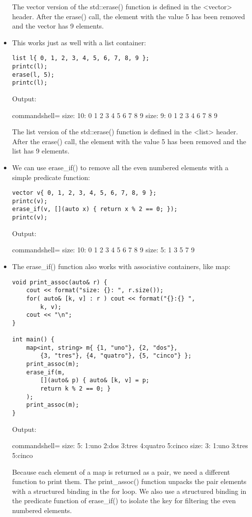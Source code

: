 \begin{itemize}
The vector version of the std::erase() function is defined in the <vector> header. After the erase() call, the element with the value 5 has been removed and the vector has 9 elements.

\item 
This works just as well with a list container:

\begin{lstlisting}[style=styleCXX]
list l{ 0, 1, 2, 3, 4, 5, 6, 7, 8, 9 };
printc(l);
erase(l, 5);
printc(l);
\end{lstlisting}

Output:

\begin{tcblisting}{commandshell={}}
size: 10: 0 1 2 3 4 5 6 7 8 9
size: 9: 0 1 2 3 4 6 7 8 9
\end{tcblisting}

The list version of the std::erase() function is defined in the <list> header. After the erase() call, the element with the value 5 has been removed and the list has 9 elements.

\item 
We can use erase\_if() to remove all the even numbered elements with a simple predicate function:

\begin{lstlisting}[style=styleCXX]
vector v{ 0, 1, 2, 3, 4, 5, 6, 7, 8, 9 };
printc(v);
erase_if(v, [](auto x) { return x % 2 == 0; });
printc(v);
\end{lstlisting}

Output:

\begin{tcblisting}{commandshell={}}
size: 10: 0 1 2 3 4 5 6 7 8 9
size: 5: 1 3 5 7 9
\end{tcblisting}

\item 
The erase\_if() function also works with associative containers, like map:

\begin{lstlisting}[style=styleCXX]
void print_assoc(auto& r) {
	cout << format("size: {}: ", r.size());
	for( auto& [k, v] : r ) cout << format("{}:{} ",
		k, v);
	cout << "\n";
}

int main() {
	map<int, string> m{ {1, "uno"}, {2, "dos"},
		{3, "tres"}, {4, "quatro"}, {5, "cinco"} };
	print_assoc(m);
	erase_if(m,
		[](auto& p) { auto& [k, v] = p;
		return k % 2 == 0; }
	);
	print_assoc(m);
}
\end{lstlisting}

Output:

\begin{tcblisting}{commandshell={}}
size: 5: 1:uno 2:dos 3:tres 4:quatro 5:cinco
size: 3: 1:uno 3:tres 5:cinco
\end{tcblisting}

Because each element of a map is returned as a pair, we need a different function to print them. The print\_assoc() function unpacks the pair elements with a structured binding in the for loop. We also use a structured binding in the predicate function of erase\_if() to isolate the key for filtering the even numbered elements.
\end{itemize}

